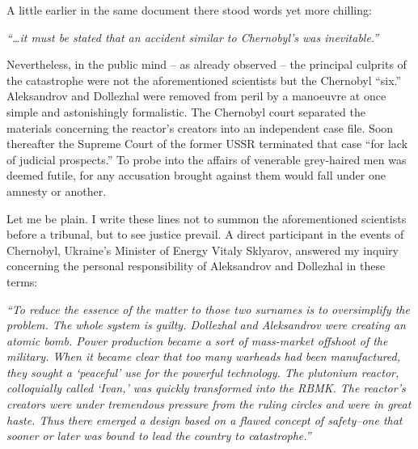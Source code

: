 \documentclass[openright]{bookest}
\begin{document}
A little earlier in the same document there stood words yet more chilling:

\begin{personal}
\textit{``\ldots it must be stated that an accident similar to Chernobyl's was inevitable.''}
\end{personal}

Nevertheless, in the public mind -- as already observed -- the principal culprits of the catastrophe were not the aforementioned scientists but the Chernobyl ``six.'' Aleksandrov and Dollezhal were removed from peril by a manoeuvre at once simple and astonishingly formalistic. The Chernobyl court separated the materials concerning the reactor's creators into an independent case file. Soon thereafter the Supreme Court of the former USSR terminated that case ``for lack of judicial prospects.'' To probe into the affairs of venerable grey-haired men was deemed futile, for any accusation brought against them would fall under one amnesty or another.

Let me be plain. I write these lines not to summon the aforementioned scientists before a tribunal, but to see justice prevail. A direct participant in the events of Chernobyl, Ukraine's Minister of Energy Vitaly Sklyarov, answered my inquiry concerning the personal responsibility of Aleksandrov and Dollezhal in these terms:

\begin{personal}
\textit{``To reduce the essence of the matter to those two surnames is to oversimplify the problem. The whole system is guilty. Dollezhal and Aleksandrov were creating an atomic bomb. Power production became a sort of mass-market offshoot of the military. When it became clear that too many warheads had been manufactured, they sought a `peaceful' use for the powerful technology. The plutonium reactor, colloquially called `Ivan,' was quickly transformed into the RBMK. The reactor's creators were under tremendous pressure from the ruling circles and were in great haste. Thus there emerged a design based on a flawed concept of safety--one that sooner or later was bound to lead the country to catastrophe.''}
\end{personal}
\end{document}
